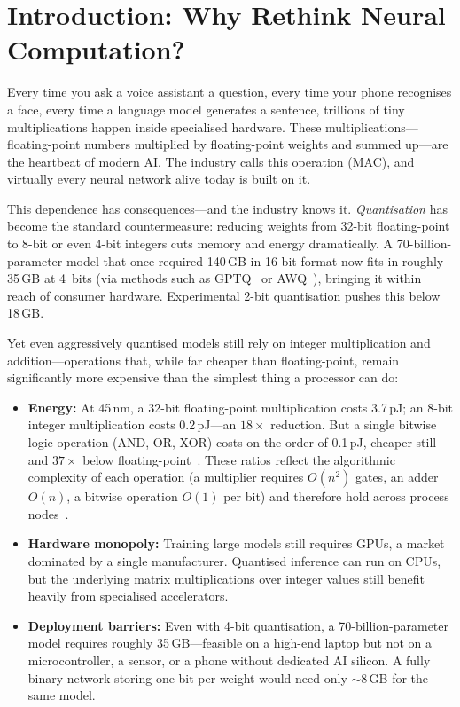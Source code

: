 \section{Introduction: Why Rethink Neural Computation?}
\label{sec:introduction}

Every time you ask a voice assistant a question, every time your phone
recognises a face, every time a language model generates a sentence,
trillions of tiny multiplications happen inside specialised hardware.
These multiplications---floating-point numbers multiplied by
floating-point weights and summed up---are the heartbeat of modern AI.
The industry calls this operation  (MAC),
and virtually every neural network alive today is built on it.

This dependence has consequences---and the industry knows it.
\emph{Quantisation} has become the standard countermeasure: reducing
weights from 32-bit floating-point to 8-bit or even 4-bit integers
cuts memory and energy dramatically. A 70-billion-parameter model
that once required 140\,GB in 16-bit format now fits in roughly
35\,GB at 4~bits (via methods such as GPTQ~\cite{frantar2022gptq} or
AWQ~\cite{lin2023awq}), bringing it within reach of consumer
hardware. Experimental 2-bit quantisation pushes this below 18\,GB.

Yet even aggressively quantised models still rely on integer
multiplication and addition---operations that, while far cheaper than
floating-point, remain significantly more expensive than the simplest
thing a processor can do:

\begin{itemize}[leftmargin=2em]
  \item \textbf{Energy:} At 45\,nm, a 32-bit floating-point
    multiplication costs 3.7\,pJ; an 8-bit integer multiplication costs
    0.2\,pJ---an $18\times$ reduction. But a single bitwise logic
    operation (AND, OR, XOR) costs on the order of 0.1\,pJ, cheaper
    still and $37\times$ below floating-point~\cite{horowitz2014energy}.
    These ratios reflect the algorithmic complexity of each operation
    (a multiplier requires $O(n^2)$ gates, an adder $O(n)$, a bitwise
    operation $O(1)$ per bit) and therefore hold across process
    nodes~\cite{stillmaker2017scaling}.
  \item \textbf{Hardware monopoly:} Training large models still requires
    GPUs, a market dominated by a single manufacturer. Quantised
    inference can run on CPUs, but the underlying matrix multiplications
    over integer values still benefit heavily from specialised
    accelerators.
  \item \textbf{Deployment barriers:} Even with 4-bit quantisation, a
    70-billion-parameter model requires roughly 35\,GB---feasible on a
    high-end laptop but not on a microcontroller, a sensor, or a phone
    without dedicated AI silicon. A fully binary network storing one bit
    per weight would need only $\sim$8\,GB for the same model.
\end{itemize}

